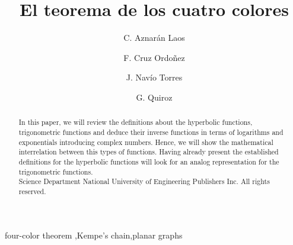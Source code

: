 \documentclass[3p,times,a4paper,twocolumn,authoryear]{elsarticle} %
\begin{document}
\begin{frontmatter}

\title{El teorema de los cuatro colores}
\author[uni]{C. Aznarán Laos}
\address{Facultad de Ciencias - Escuela profesional de Matemática}

\author[uni]{F. Cruz Ordoñez}
\address{Facultad de Ciencias - Escuela profesional de Matemática}

\author[uni]{J. Navío Torres}
\address{Facultad de Ciencias - Escuela profesional de Ciencia de la Computación}

\author[uni]{G. Quiroz}
\address{Facultad de Ciencias - Escuela profesional de Matemática}

\address[uni]{Universidad Nacional de Ingeniería,	Av. Túpac Amaru 210, Rímac, Lima 25, Peru}

%
\begin{abstract}
In this paper, we will review the definitions about the hyperbolic functions, trigonometric functions and deduce their inverse functions in terms of logarithms and exponentials introducing complex numbers.
Hence, we will show the mathematical interrelation between this types of functions.
Having already present the established definitions for the hyperbolic functions will look for an analog representation for the trigonometric functions.%
\\[0.2cm]
\textcopyright \hspace{.1cm}Science Department National University of Engineering Publishers Inc. All rights reserved. 
\end{abstract}

\begin{keyword}
four-color theorem \sep Kempe's chain\sep planar graphs
\end{keyword}

\end{frontmatter}
\end{document}
